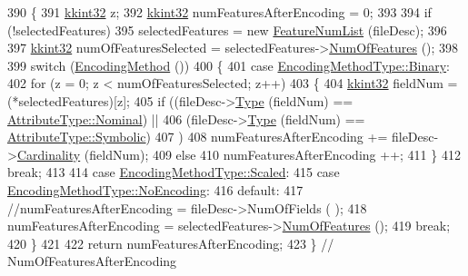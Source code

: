 \begin{DoxyCode}
390 \{
391   \hyperlink{namespace_k_k_b_a8fa4952cc84fda1de4bec1fbdd8d5b1b}{kkint32} z;
392   \hyperlink{namespace_k_k_b_a8fa4952cc84fda1de4bec1fbdd8d5b1b}{kkint32} numFeaturesAfterEncoding = 0;
393 
394   \textcolor{keywordflow}{if}  (!selectedFeatures)
395     selectedFeatures = \textcolor{keyword}{new} \hyperlink{class_k_k_m_l_l_1_1_feature_num_list}{FeatureNumList} (fileDesc);
396 
397   \hyperlink{namespace_k_k_b_a8fa4952cc84fda1de4bec1fbdd8d5b1b}{kkint32} numOfFeaturesSelected = selectedFeatures->\hyperlink{class_k_k_m_l_l_1_1_feature_num_list_af2d974ca245a5d3c2bc88da0fe674493}{NumOfFeatures} ();
398 
399   \textcolor{keywordflow}{switch} (\hyperlink{class_k_k_m_l_l_1_1_model_param_a6c9ed6cff0839bca401fa94ecf3b4558}{EncodingMethod} ())
400   \{
401   \textcolor{keywordflow}{case} \hyperlink{class_k_k_m_l_l_1_1_model_param_a09e49f936f411dba6f08bdaf8d6b4a98a6ce976e8f061b2b5cfe4d0c50c3405dd}{EncodingMethodType::Binary}:
402     \textcolor{keywordflow}{for}  (z = 0; z < numOfFeaturesSelected; z++)
403     \{
404       \hyperlink{namespace_k_k_b_a8fa4952cc84fda1de4bec1fbdd8d5b1b}{kkint32}  fieldNum = (*selectedFeatures)[z];
405       \textcolor{keywordflow}{if}  ((fileDesc->\hyperlink{class_k_k_m_l_l_1_1_file_desc_a4d84c65489e2ac36e91cb1d8a34adb89}{Type} (fieldNum) == \hyperlink{namespace_k_k_m_l_l_a99973706982b59debba670e2480555aba8c28d7c312116b8a46e2f466cb33d5b4}{AttributeType::Nominal})  ||
406            (fileDesc->\hyperlink{class_k_k_m_l_l_1_1_file_desc_a4d84c65489e2ac36e91cb1d8a34adb89}{Type} (fieldNum) == \hyperlink{namespace_k_k_m_l_l_a99973706982b59debba670e2480555abaaddee1396a3e20ceea8071ed6da54866}{AttributeType::Symbolic})
407           )
408         numFeaturesAfterEncoding += fileDesc->\hyperlink{class_k_k_m_l_l_1_1_file_desc_a58a548ebb87bfc265d05208871390f54}{Cardinality} (fieldNum);
409       \textcolor{keywordflow}{else}
410         numFeaturesAfterEncoding ++;
411     \}
412     \textcolor{keywordflow}{break};
413 
414   \textcolor{keywordflow}{case} \hyperlink{class_k_k_m_l_l_1_1_model_param_a09e49f936f411dba6f08bdaf8d6b4a98a7380ae6c5e1189eef50cfd0557d74e99}{EncodingMethodType::Scaled}:
415   \textcolor{keywordflow}{case} \hyperlink{class_k_k_m_l_l_1_1_model_param_a09e49f936f411dba6f08bdaf8d6b4a98a3f6e102acead54bbbf4c704dd88fb94b}{EncodingMethodType::NoEncoding}:
416   \textcolor{keywordflow}{default}:
417     \textcolor{comment}{//numFeaturesAfterEncoding = fileDesc->NumOfFields ( );}
418     numFeaturesAfterEncoding = selectedFeatures->\hyperlink{class_k_k_m_l_l_1_1_feature_num_list_af2d974ca245a5d3c2bc88da0fe674493}{NumOfFeatures} ();
419     \textcolor{keywordflow}{break};
420   \}
421 
422   \textcolor{keywordflow}{return}  numFeaturesAfterEncoding;
423 \}  \textcolor{comment}{// NumOfFeaturesAfterEncoding }
\end{DoxyCode}
